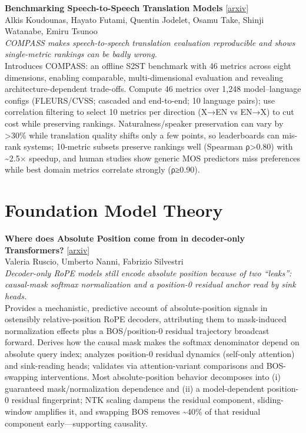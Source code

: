\documentclass[12pt,letterpaper]{article}
\begin{document}
\medskip

{\small\textbf{Benchmarking Speech-to-Speech Translation Models}} {\scriptsize[\href{https://arxiv.org/abs/2606.03241}{arxiv}]}\\
{\scriptsize Alkis Koudounas, Hayato Futami, Quentin Jodelet, Osamu Take, Shinji Watanabe, Emiru Tsunoo}\\

{\small\textit{COMPASS makes speech-to-speech translation evaluation reproducible and shows single-metric rankings can be badly wrong.}}\\[1pt]
{\footnotesize Introduces COMPASS: an offline S2ST benchmark with 46 metrics across eight dimensions, enabling comparable, multi-dimensional evaluation and revealing architecture-dependent trade-offs. Compute 46 metrics over 1,248 model--language configs (FLEURS/CVSS; cascaded and end-to-end; 10 language pairs); use correlation filtering to select 10 metrics per direction (X→EN vs EN→X) to cut cost while preserving rankings. Naturalness/speaker preservation can vary by >30\% while translation quality shifts only a few points, so leaderboards can mis-rank systems; 10-metric subsets preserve rankings well (Spearman ρ>0.80) with \textasciitilde{}2.5× speedup, and human studies show generic MOS predictors miss preferences while best domain metrics correlate strongly (ρ≥0.90).}

\medskip


\section*{Foundation Model Theory}

{\small\textbf{Where does Absolute Position come from in decoder-only Transformers?}} {\scriptsize[\href{https://arxiv.org/abs/2606.06160}{arxiv}]}\\
{\scriptsize Valeria Ruscio, Umberto Nanni, Fabrizio Silvestri}\\

{\small\textit{Decoder-only RoPE models still encode absolute position because of two ``leaks'': causal-mask softmax normalization and a position-0 residual anchor read by sink heads.}}\\[1pt]
{\footnotesize Provides a mechanistic, predictive account of absolute-position signals in ostensibly relative-position RoPE decoders, attributing them to mask-induced normalization effects plus a BOS/position-0 residual trajectory broadcast forward. Derives how the causal mask makes the softmax denominator depend on absolute query index; analyzes position-0 residual dynamics (self-only attention) and sink-reading heads; validates via attention-variant comparisons and BOS-swapping interventions. Most absolute-position behavior decomposes into (i) guaranteed mask/normalization dependence and (ii) a model-dependent position-0 residual fingerprint; NTK scaling dampens the residual component, sliding-window amplifies it, and swapping BOS removes \textasciitilde{}40\% of that residual component early---supporting causality.}
\end{document}
